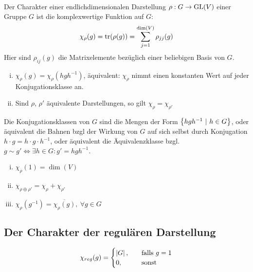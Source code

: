 \begin{definition}[Charakter]
    Der Charakter einer endlichdimensionalen Darstellung $\rho: G \rightarrow \text{GL}(V)$
    einer Gruppe $G$ ist die komplexwertige Funktion auf $G$:
    \begin{align*}
        \chi_\rho (g) = \text{tr}(\rho(g)) = \sum_{j = 1}^{\dim (V)} \rho_{jj}(g)
    \end{align*}
    Hier sind $\rho_{ij}(g)$ die Matrixelemente bezüglich einer beliebigen
    Basis von $G$.
\end{definition}

\begin{satz}
    \begin{enumerate}[(i)]
        \item $\chi_\rho (g) = \chi_{\rho} (h g h^{-1})$, äquivalent: $\chi_\rho$
            nimmt einen konstanten Wert auf jeder Konjugationsklasse an.
        \item Sind $\rho$, $\rho'$ äquivalente Darstellungen, so gilt $\chi_\rho = \chi_{\rho'}$
    \end{enumerate}
\end{satz}

\begin{definition}[Konjugationsklasse]
    Die Konjugationsklassen von $G$ sind die Mengen der Form
    $\left\{ h g h^{-1} \ | \ h \in G \right\}$, oder äquivalent
    die Bahnen bzgl der Wirkung von $G$ auf sich selbst durch Konjugation
    $h \cdot g = h \cdot g \cdot h^{-1}$, oder äquivalent die Äquivalenzklasse
    bzgl. $g \sim g' \Leftrightarrow \exists h \in G : g' = h g h^{-1}$.
\end{definition}

\begin{lemma}
    \begin{enumerate}[(i)]
        \item $\chi_\rho (1) = \dim(V)$
        \item $\chi_{\rho \oplus \rho'} = \chi_{\rho} + \chi_{\rho'}$
        \item $\chi_{\rho} (g^{-1}) = \overline{\chi_\rho (g)} , \ \forall g \in G$
    \end{enumerate}
\end{lemma}

\subsection{Der Charakter der regulären Darstellung}
\begin{align*}
    \chi_{reg} (g) = \begin{cases}
        \left\vert G \right\vert,& \hspace{10pt} \text{falls } g = 1
        \\
        0,& \hspace{10pt} \text{sonst}
    \end{cases}
\end{align*}

